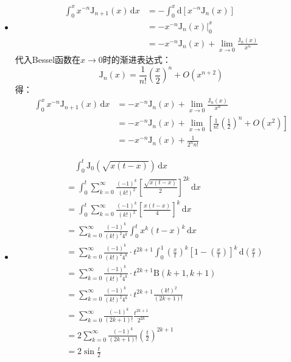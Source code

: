 \documentclass[fontset=windows]{ctexart}
\begin{document}
\begin{itemize}
    \item[3.(1)]
    \begin{align*}
    \int_0^x x^{-n}\mathrm{J}_{n+1}(x)\,\mathrm{d}x
    &= -\int_0^x\mathrm{d}\left[x^{-n}\mathrm{J}_n(x)\right] \\
    &= \left.-x^{-n}\mathrm{J}_n(x)\right|_0^x \\
    &= -x^{-n}\mathrm{J}_n(x) + \lim_{x \to 0}\frac{\mathrm{J}_n(x)}{x^n}
    \end{align*}
    代入Bessel函数在$x \to 0$时的渐进表达式：
    \[
    \mathrm{J}_n(x) = \frac{1}{n!}\left(\frac{x}{2}\right)^n + O(x^{n+2})
    \]
    得：
    \begin{align*}
    \int_0^x x^{-n}\mathrm{J}_{n+1}(x)\,\mathrm{d}x
    &= -x^{-n}\mathrm{J}_n(x) + \lim_{x \to 0}\frac{\mathrm{J}_n(x)}{x^n} \\
    &= -x^{-n}\mathrm{J}_n(x) + \lim_{x \to 0}\left[\frac{1}{n!}\left(\frac{1}{2}\right)^n + O(x^{2})\right] \\
    &= -x^{-n}\mathrm{J}_n(x) + \frac{1}{2^n n!}
    \end{align*}
    \medskip

    \item[3.(3)]
    \begin{align*}
    &\quad \int_0^t \mathrm{J}_0(\sqrt{x(t-x)})\,\mathrm{d}x \\
    &= \int_0^t\sum_{k=0}^{\infty}\frac{(-1)^k}{(k!)^2}\left[\frac{\sqrt{x(t-x)}}{2}\right]^{2k}\,\mathrm{d}x \\
    &= \int_0^t\sum_{k=0}^{\infty}\frac{(-1)^k}{(k!)^2}\left[\frac{x(t-x)}{4}\right]^{k}\,\mathrm{d}x \\
    &= \sum_{k=0}^{\infty}\frac{(-1)^k}{(k!)^2 4^k}\int_0^t x^k(t-x)^k\,\mathrm{d}x \\
    &= \sum_{k=0}^{\infty}\frac{(-1)^k}{(k!)^2 4^k}\cdot t^{2k+1}\int_0^1 \left(\frac{x}{t}\right)^k\left[1-\left(\frac{x}{t}\right)\right]^k\,\mathrm{d}\left(\frac{x}{t}\right) \\
    &= \sum_{k=0}^{\infty}\frac{(-1)^k}{(k!)^2 4^k}\cdot t^{2k+1}\mathrm{B}(k+1,k+1) \\
    &= \sum_{k=0}^{\infty}\frac{(-1)^k}{(k!)^2 4^k}\cdot t^{2k+1}\frac{(k!)^2}{(2k+1)!} \\
    &= \sum_{k=0}^{\infty}\frac{(-1)^k}{(2k+1)!}\frac{t^{2k+1}}{2^{2k}} \\
    &= 2\sum_{k=0}^{\infty}\frac{(-1)^k}{(2k+1)!}\left(\frac{t}{2}\right)^{2k+1} \\
    &= 2\sin\frac{t}{2}
    \end{align*}
    \bigskip


\end{itemize}
\end{document}
